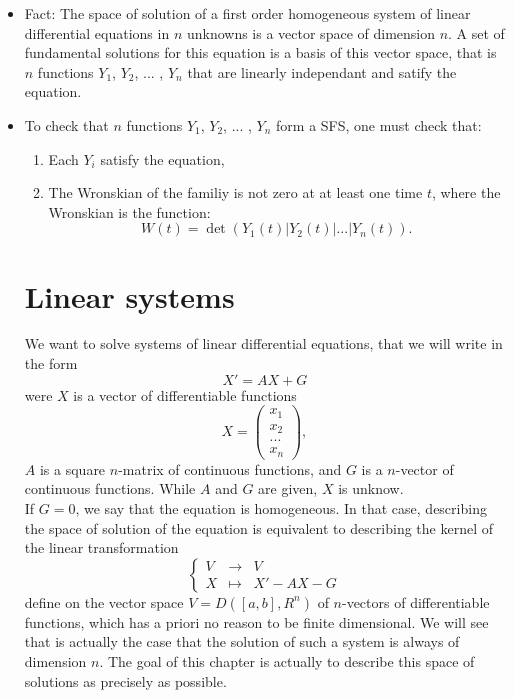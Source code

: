 \begin{itemize}
\item Fact: The space of solution of a first order homogeneous system of linear differential equations in $n$ unknowns is a vector space of dimension $n$. A set of fundamental solutions for this equation is a basis of this vector space, that is $n $ functions $Y_1$, $Y_2$, ... , $Y_n$ that are linearly independant and satify the equation.
\item To check that $n $ functions $Y_1$, $Y_2$, ... , $Y_n$ form a SFS, one must check that:
\begin{enumerate}
\item Each $Y_i$ satisfy the equation,
\item The Wronskian of the familiy is not zero at at least one time $t$, where the Wronskian is the function:
\[W(t) = \det (Y_1(t) | Y_2(t) | ... | Y_n(t) ).\]
\end{enumerate}

\section{Linear systems}  %

We want to solve systems of linear differential equations, that we will write in the form 
\[X' = AX+ G\]
were $X$ is a vector of differentiable functions
\[X= \begin{pmatrix} x_1 \\ x_2 \\ ... \\ x_n \end{pmatrix},\]
$A$ is a square $n$-matrix of continuous functions, and $G$ is a $n$-vector of continuous functions. While $A$ and $G$ are given, $X$ is unknow.\\

If $G=0$, we say that the equation is homogeneous. In that case, describing the space of solution of the equation is equivalent to describing the kernel of the linear transformation
\[\left\{\begin{array}{rcl} V & \rightarrow & V \\
X & \mapsto & X' - AX - G\end{array}\right.\]
define on the vector space $V= D([a,b], R^n)$ of $n$-vectors of differentiable functions, which has a priori no reason to be finite dimensional. We will see that is actually the case that the solution of such a system is always of dimension $n$. The goal of this chapter is actually to describe this space of solutions as precisely as possible. 


\end{itemize}

